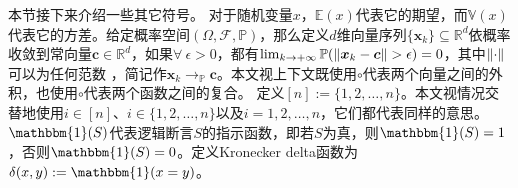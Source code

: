 


本节接下来介绍一些其它符号。
对于随机变量$x$，$\mathbb{E}(x)$代表它的期望，而$\mathbb{V}(x)$代表它的方差。给定概率空间$(\Omega,\mathcal{F},\mathbb{P})$，那么定义$d$维向量序列$\{\boldsymbol{x}_{k}\}\subseteq\mathbb{R}^{d}$依概率收敛到常向量$\boldsymbol{c}\in\mathbb{R}^{d}$，如果$\forall~\epsilon >0$，都有$\lim_{k\rightarrow+\infty}\allowbreak\mathbb{P}(\left\lVert\boldsymbol{x}_{k}-\boldsymbol{c}\right\rVert>\epsilon)=0$，其中$\left\lVert\cdot\right\rVert$可以为任何范数
，简记作$\boldsymbol{x}_{k}\rightarrow_{\mathbb{P}}\boldsymbol{c}$。本文视上下文既使用$\circ$代表两个向量之间的外积，也使用$\circ$代表两个函数之间的复合。
定义$[n]:=\{1,2,\ldots,n\}$。本文视情况交替地使用$i\in[n]$、$i\in\{1,2,\ldots,n\}$以及$i=1,2,\ldots,n$，它们都代表同样的意思。
$\mathbbm{1}(S)$代表逻辑断言$S$的指示函数，即若$S$为真，则$\mathbbm{1}(S)=1$，否则$\mathbbm{1}(S)=0$。定义Kronecker delta函数为$\delta(x,y):=\mathbbm{1}(x=y)$。

